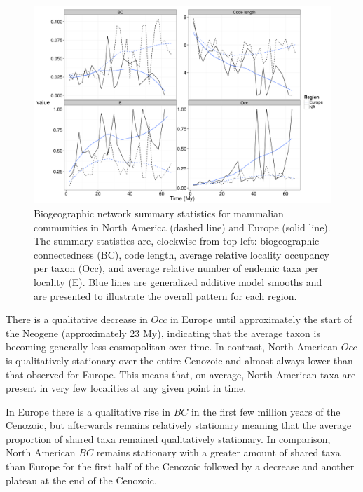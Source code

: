 \documentclass[12pt,letterpaper]{article}
\begin{document}
\begin{figure}[ht]
  \begin{center}
    \includegraphics[height = 0.4\textheight, keepaspectratio = true]{figure/gen_bin}
  \end{center}
  \caption[North American and European community connectedness]{Biogeographic network summary statistics for mammalian communities in North America (dashed line) and Europe (solid line). The summary statistics are, clockwise from top left: biogeographic connectedness (BC), code length, average relative locality occupancy per taxon (Occ), and average relative number of endemic taxa per locality (E). Blue lines are generalized additive model smooths and are presented to illustrate the overall pattern for each region.} 
  \label{fig:mam_con}
\end{figure}

There is a qualitative decrease in \(Occ\) in Europe until approximately the start of the Neogene (approximately 23 My), indicating that the average taxon is becoming generally less cosmopolitan over time. In contrast, North American \(Occ\) is qualitatively stationary over the entire Cenozoic and almost always lower than that observed for Europe. This means that, on average, North American taxa are present in very few localities at any given point in time.

In Europe there is a qualitative rise in \(BC\) in the first few million years of the Cenozoic, but afterwards remains relatively stationary meaning that the average proportion of shared taxa remained qualitatively stationary. In comparison, North American \(BC\) remains stationary with a greater amount of shared taxa than Europe for the first half of the Cenozoic followed by a decrease and another plateau at the end of the Cenozoic.
\end{document}
